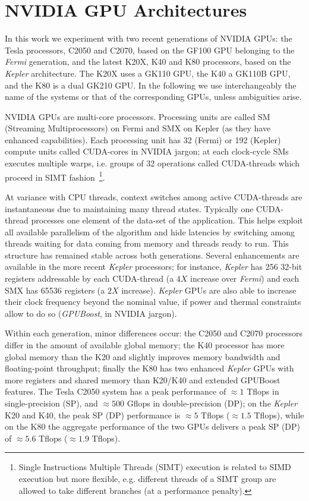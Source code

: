 \documentclass{elsarticle}
\begin{document}

\section{NVIDIA GPU Architectures}\label{sec:gpu}

In this work we experiment with two recent generations of NVIDIA GPUs: 
the Tesla processors, C2050 and C2070, based on the GF100 GPU belonging 
to the {\em Fermi} generation, and the latest K20X, K40 and K80 processors, 
based on the {\em Kepler} architecture. The K20X uses a GK110 GPU, 
the K40 a GK110B GPU, and the K80 is a dual GK210 GPU. 
%
In the following we use interchangeably the name of the systems or that
of the corresponding GPUs, unless ambiguities arise.

NVIDIA GPUs are multi-core processors. 
%
Processing units are called SM (Streaming Multiprocessors) on Fermi and 
SMX on Kepler (as they have enhanced capabilities). Each processing unit 
has 32 (Fermi) or 192 (Kepler) compute units called CUDA-cores in NVIDIA 
jargon; at each clock-cycle SMs executes multiple warps, i.e. groups of 
32 operations called CUDA-threads which proceed in SIMT fashion~\footnote{
Single Instructions Multiple Threads (SIMT) execution is related 
to SIMD execution but more flexible, e.g. different threads of a 
SIMT group are allowed to take different branches (at a performance penalty).}. 

At variance with CPU threads, context switches among active CUDA-threads 
are instantaneous due to maintaining many thread states. 
%
Typically one CUDA-thread processes one element of the data-set 
of the application. 
This helps exploit all available parallelism of the algorithm and  
hide latencies by switching among threads waiting for 
data coming from memory and threads ready to run.
%
This structure has remained stable across both generations. Several enhancements 
are available in the more recent {\em Kepler} processors; for instance, 
{\em Kepler} has 256 32-bit registers addressable by each CUDA-thread
(a $4X$ increase over {\em Fermi}) and each SMX has 65536 registers (a $2X$ increase). 
{\em Kepler} GPUs are also able to increase their clock frequency 
beyond the nominal value, if power and thermal 
constraints allow to do so ({\em GPUBoost}, in NVIDIA jargon). 

Within each generation, minor differences occur: the C2050 and C2070 processors
differ in the amount of available global memory;  the K40 processor has more
global memory than the K20 and slightly improves memory bandwidth and
floating-point throughput; finally the K80 has two enhanced {\em Kepler} 
GPUs with more registers and shared memory than K20/K40 and extended GPUBoost features. 
%
The Tesla C2050 system has a peak performance of $\approx 1$ Tflops 
in single-precision (SP), and $\approx 500$ Gflops in double-precision (DP); 
on the {\em Kepler} K20 and K40, the peak SP (DP) performance is
$\approx 5$ Tflops ($\approx 1.5$ Tflops), while on the K80 the 
aggregate performance of the two GPUs delivers a peak SP (DP) 
of $\approx 5.6$ Tflops ($\approx 1.9$ Tflops).
\end{document}
